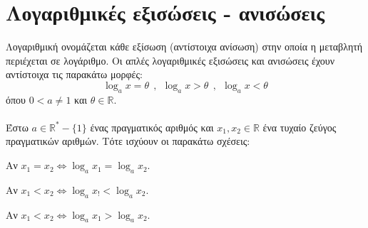 \section{Λογαριθμικές εξισώσεις - ανισώσεις}
\orismoi
{}
Λογαριθμική ονομάζεται κάθε εξίσωση (αντίστοιχα ανίσωση) στην οποία η μεταβλητή περιέχεται σε λογάριθμο. Οι απλές λογαριθμικές εξισώσεις και ανισώσεις έχουν αντίστοιχα τις παρακάτω μορφές:
\[ \log_{a}{x}=\theta\ \ ,\ \ \log_{a}{x}>\theta\ \ ,\ \ \log_{a}{x}<\theta \]
όπου $ 0<a\neq1 $ και $ \theta\in\mathbb{R} $.\\\\
\thewrhmata
{}
Έστω $ a\in\mathbb{R}^*-\{1\} $ ένας πραγματικός αριθμός και $ x_1,x_2\in\mathbb{R} $ ένα τυχαίο ζεύγος πραγματικών αριθμών. Τότε ισχύουν οι παρακάτω σχέσεις:
\begin{multicols}{2}
\begin{rlist}
\item Αν $ x_1=x_2\Leftrightarrow \log_{a}{x_1}=\log_{a}{x_2} $.
\item Αν $ x_1<x_2\Leftrightarrow \log_{a}{x_!}<\log_{a}{x_2} $.
\item Αν $ x_1<x_2\Leftrightarrow \log_{a}{x_1}>\log_{a}{x_2} $. 
\end{rlist}
\end{multicols}